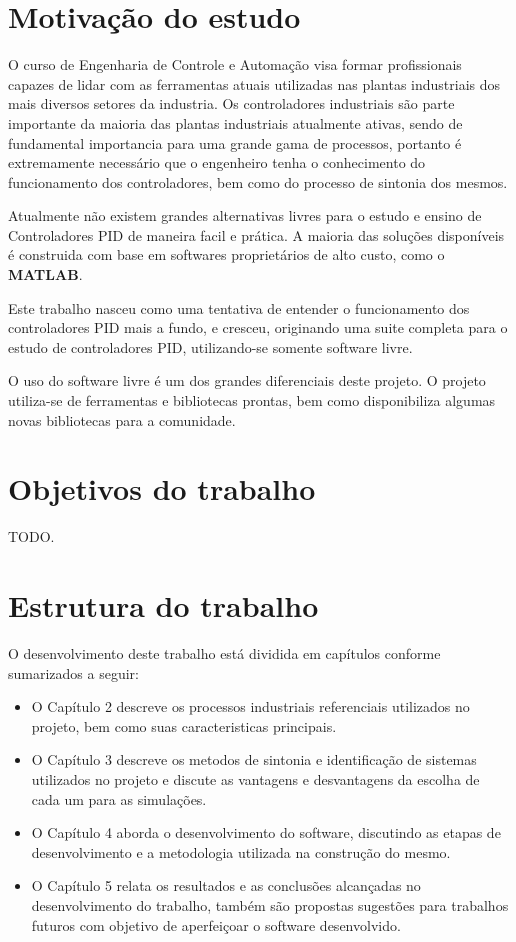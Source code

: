 \section{Motivação do estudo}

    O curso de Engenharia de Controle e Automação visa formar profissionais
    capazes de lidar com as ferramentas atuais utilizadas nas plantas industriais
    dos mais diversos setores da industria. Os controladores industriais são
    parte importante da maioria das plantas industriais atualmente ativas,
    sendo de fundamental importancia para uma grande gama de processos, portanto
    é extremamente necessário que o engenheiro tenha o conhecimento do funcionamento
    dos controladores, bem como do processo de sintonia dos mesmos.
    
    Atualmente não existem grandes alternativas livres para o estudo e ensino
    de Controladores PID de maneira facil e prática. A maioria das soluções
    disponíveis é construida com base em softwares proprietários de alto custo,
    como o \textbf{MATLAB}.
    
    Este trabalho nasceu como uma tentativa de entender o funcionamento dos
    controladores PID mais a fundo, e cresceu, originando uma suite completa
    para o estudo de controladores PID, utilizando-se somente software livre.

    O uso do software livre é um dos grandes diferenciais deste projeto. O projeto
    utiliza-se de ferramentas e bibliotecas prontas, bem como disponibiliza algumas
    novas bibliotecas para a comunidade.

\section{Objetivos do trabalho}

    TODO.

\section{Estrutura do trabalho}

    O desenvolvimento deste trabalho está dividida em capítulos conforme sumarizados a seguir:

    \begin{itemize}
        \item O Capítulo 2 descreve os processos industriais referenciais utilizados no
            projeto, bem como suas caracteristicas principais.
        \item O Capítulo 3 descreve os metodos de sintonia e identificação de sistemas
            utilizados no projeto e discute as vantagens e desvantagens da escolha de
            cada um para as simulações.
        \item O Capítulo 4 aborda o desenvolvimento do software, discutindo as etapas de
            desenvolvimento e a metodologia utilizada na construção do mesmo.
        \item O Capítulo 5 relata os resultados e as conclusões alcançadas no desenvolvimento
            do trabalho, também são propostas sugestões para trabalhos futuros com objetivo
            de aperfeiçoar o software desenvolvido.
    \end{itemize}

